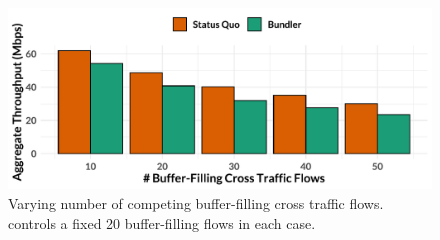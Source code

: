 \begin{figure}
    \centering
\begin{knitrout}
\color{fgcolor}
\includegraphics[width=\maxwidth]{figure/robust_cr-elastic-1} 

\end{knitrout}
    \caption{Varying number of competing buffer-filling cross traffic flows. \name controls a fixed 20 buffer-filling flows in each case.}
    \label{fig:robust:cr-elastic}
\end{figure}

\newcommand{\bundlerElasticTputWorseness}{18\%\xspace}
\newcommand{\bundlerElasticTputWorsenessTen}{12\%\xspace}
\newcommand{\bundlerElasticTputWorsenessFifty}{22\%\xspace}
